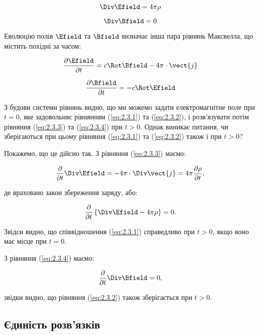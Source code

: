 \begin{equation}
\Div \Efield = 4\pi\rho \label{eq:2.3.1}
\end{equation}

\begin{equation}
\Div \Bfield = 0 \label{eq:2.3.2}
\end{equation}

Еволюцію полів \( \Efield \) та \( \Bfield \) визначає інша пара рівнянь Максвелла, що містить похідні за часом:

\begin{equation}
\frac{\partial \Efield}{\partial t} = c \Rot \Bfield - 4\pi \cdot \vect{j} \label{eq:2.3.3}
\end{equation}

\begin{equation}
\frac{\partial \Bfield}{\partial t} = -c \Rot \Efield \label{eq:2.3.4}
\end{equation}

З будови системи рівнянь видно, що ми можемо задати електромагнітне поле при \( t = 0 \), яке задовольняє рівнянням (\ref{eq:2.3.1}) та
(\ref{eq:2.3.2}), і розв’язувати потім рівняння (\ref{eq:2.3.3}) та (\ref{eq:2.3.4}) при \( t > 0 \). Однак виникає питання, чи зберігаються при цьому
рівняння (\ref{eq:2.3.1}) та (\ref{eq:2.3.2}) також і при \( t > 0 \)?

Покажемо, що це дійсно так. З рівняння (\ref{eq:2.3.3}) маємо:

\[
\frac{\partial}{\partial t} \Div \Efield = -4\pi \cdot \Div \vect{j} = 4\pi \frac{\partial \rho}{\partial t},
\]

де враховано закон збереження заряду, або:

\[
\frac{\partial}{\partial t} \left\{ \Div \Efield - 4\pi\rho \right\} = 0.
\]

Звідси видно, що співвідношення (\ref{eq:2.3.1}) справедливо при \( t > 0 \), якщо воно має місце при \( t = 0 \).

З рівняння (\ref{eq:2.3.4}) маємо:

\[
\frac{\partial}{\partial t} \Div \Bfield = 0,
\]

звідки видно, що рівняння (\ref{eq:2.3.2}) також зберігається при \( t > 0 \).

\subsection*{Єдиність розв’язків}



